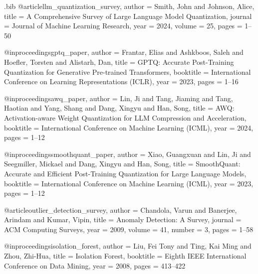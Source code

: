 \usepackage[UTF8]{ctex}
\usepackage{xeCJK}
\usepackage{fontspec}

\usepackage{filecontents}

\begin{filecontents}{\jobname.bib}
@article{llm_quantization_survey,
  author =       {Smith, John and Johnson, Alice},
  title =        {A Comprehensive Survey of Large Language Model Quantization},
  journal =      {Journal of Machine Learning Research},
  year =         2024,
  volume =       25,
  pages =        {1--50}
}

@inproceedings{gptq_paper,
  author =       {Frantar, Elias and Ashkboos, Saleh and Hoefler, Torsten and Alistarh, Dan},
  title =        {GPTQ: Accurate Post-Training Quantization for Generative Pre-trained Transformers},
  booktitle =    {International Conference on Learning Representations (ICLR)},
  year =         2023,
  pages =        {1--16}
}

@inproceedings{awq_paper,
  author =       {Lin, Ji and Tang, Jiaming and Tang, Haotian and Yang, Shang and Dang, Xingyu and Han, Song},
  title =        {AWQ: Activation-aware Weight Quantization for LLM Compression and Acceleration},
  booktitle =    {International Conference on Machine Learning (ICML)},
  year =         2024,
  pages =        {1--12}
}

@inproceedings{smoothquant_paper,
  author =       {Xiao, Guangxuan and Lin, Ji and Seegmiller, Mickael and Dang, Xingyu and Han, Song},
  title =        {SmoothQuant: Accurate and Efficient Post-Training Quantization for Large Language Models},
  booktitle =    {International Conference on Machine Learning (ICML)},
  year =         2023,
  pages =        {1--12}
}

@article{outlier_detection_survey,
  author =       {Chandola, Varun and Banerjee, Arindam and Kumar, Vipin},
  title =        {Anomaly Detection: A Survey},
  journal =      {ACM Computing Surveys},
  year =         2009,
  volume =       41,
  number =       3,
  pages =        {1--58}
}

@inproceedings{isolation_forest,
  author =       {Liu, Fei Tony and Ting, Kai Ming and Zhou, Zhi-Hua},
  title =        {Isolation Forest},
  booktitle =    {Eighth IEEE International Conference on Data Mining},
  year =         2008,
  pages =        {413--422}
}


\end{filecontents}
